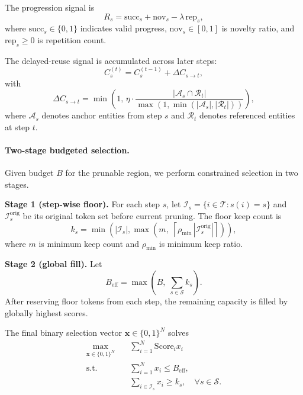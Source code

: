 \documentclass[11pt]{article}
\begin{document}
The progression signal is
\begin{equation}
\label{eq:reward}
R_s = \mathrm{succ}_s + \mathrm{nov}_s - \lambda\,\mathrm{rep}_s,
\end{equation}
where $\mathrm{succ}_s\in\{0,1\}$ indicates valid progress, $\mathrm{nov}_s\in[0,1]$ is novelty ratio, and $\mathrm{rep}_s\ge 0$ is repetition count.

The delayed-reuse signal is accumulated across later steps:
\begin{equation}
\label{eq:citation}
C_s^{(t)} = C_s^{(t-1)} + \Delta C_{s\to t},
\end{equation}
with
\begin{equation}
\label{eq:citation-inc}
\Delta C_{s\to t}
=
\min\!\left(
1,\,
\eta\cdot
\frac{|\mathcal{A}_s\cap\mathcal{R}_t|}
{\max\!\left(1,\min(|\mathcal{A}_s|,|\mathcal{R}_t|)\right)}
\right),
\end{equation}
where $\mathcal{A}_s$ denotes anchor entities from step $s$ and $\mathcal{R}_t$ denotes referenced entities at step $t$.

\paragraph{Two-stage budgeted selection.}
Given budget $B$ for the prunable region, we perform constrained selection in two stages.

\textbf{Stage 1 (step-wise floor).}
For each step $s$, let $\mathcal{I}_s=\{i\in\mathcal{T}: s(i)=s\}$ and $\mathcal{I}_s^{\mathrm{orig}}$ be its original token set before current pruning. The floor keep count is
\begin{equation}
\label{eq:ks}
k_s =
\min\!\left(
|\mathcal{I}_s|,
\max\!\left(
m,\;
\left\lceil \rho_{\min}\,|\mathcal{I}_s^{\mathrm{orig}}| \right\rceil
\right)
\right),
\end{equation}
where $m$ is minimum keep count and $\rho_{\min}$ is minimum keep ratio.

\textbf{Stage 2 (global fill).}
Let
\begin{equation}
\label{eq:beff}
B_{\mathrm{eff}} = \max\!\left(B,\; \sum_{s\in\mathcal{S}} k_s\right).
\end{equation}
After reserving floor tokens from each step, the remaining capacity is filled by globally highest scores.

The final binary selection vector $\mathbf{x}\in\{0,1\}^N$ solves
\begin{equation}
\label{eq:objective}
\begin{aligned}
\max_{\mathbf{x}\in\{0,1\}^{N}} \quad
& \sum_{i=1}^{N}\mathrm{Score}_i x_i \\
\text{s.t.}\quad
& \sum_{i=1}^{N} x_i \le B_{\mathrm{eff}}, \\
& \sum_{i\in\mathcal{I}_s} x_i \ge k_s,\quad \forall s\in\mathcal{S}.
\end{aligned}
\end{equation}
\end{document}
